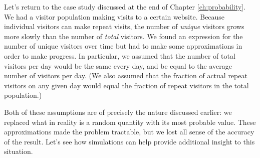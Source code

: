 % 
% 

Let's return to the case study discussed at the end of Chapter
\ref{ch:probability}. We had a visitor population making visits to a
certain website.  Because individual visitors can make repeat visits,
the number of \emph{unique} visitors grows more slowly than the number
of \emph{total} visitors. We found an expression for the number\vadjust{\pagebreak} of
unique visitors over time but had to make some approximations in
order to make progress.  In particular, we assumed that the number of
total visitors per day would be the same every day, and be equal to
the average number of visitors per day. (We also assumed that the
fraction of actual repeat visitors on any given day would equal the
fraction of repeat visitors in the total population.)

Both of these assumptions are of precisely the nature discussed 
earlier: we replaced what in reality is a random quantity with its
most probable value. These approximations made the problem tractable,
but we lost all sense of the accuracy of the result. Let's see how
simulations can help provide additional insight to this situation.


